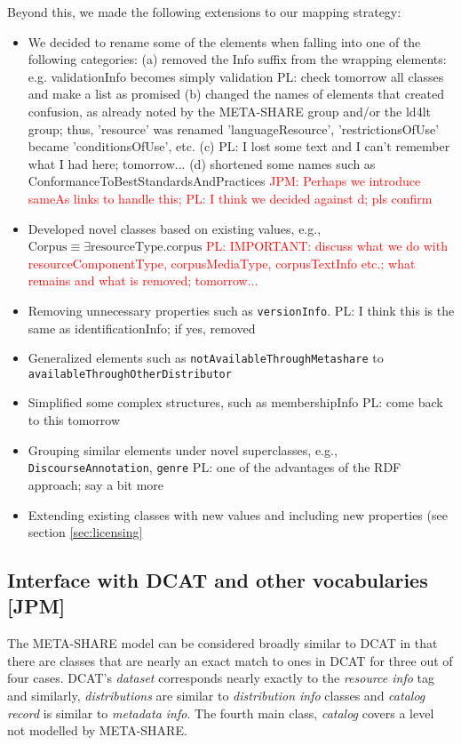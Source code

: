 \documentclass{llncs}
\begin{document}
{Beyond this, we made the following extensions to our mapping strategy:
\begin{itemize}
\item We decided to rename some of the elements when falling into one of the following categories:
(a) removed the Info suffix from the wrapping elements: e.g. validationInfo becomes simply validation {PL: check tomorrow all classes and make a list as promised}
(b) changed the names of elements that created confusion, as already noted by the META-SHARE group and/or the ld4lt group; thus, 'resource' was renamed 'languageResource', 'restrictionsOfUse' became 'conditionsOfUse', etc.
(c) {PL: I lost some text and I can't remember what I had here; tomorrow...}
(d) shortened some names such as ConformanceToBestStandardsAndPractices
\textcolor{red}{JPM: Perhaps we introduce sameAs links to handle this; PL: I think we decided against d; pls confirm}
\item Developed novel classes based on existing values, e.g.,
$\mathrm{Corpus} \equiv \exists \mathrm{resourceType}.\mathrm{corpus}$
\textcolor{red} {PL: IMPORTANT: discuss what we do with resourceComponentType, corpusMediaType, corpusTextInfo etc.; what remains and what is removed; tomorrow...}
\item Removing unnecessary properties such as {\tt versionInfo}.
{PL: I think this is the same as identificationInfo; if yes, removed}
\item Generalized elements such as {\tt notAvailableThroughMetashare} to {\tt availableThroughOtherDistributor}
\item Simplified some complex structures, such as membershipInfo  
{PL: come back to this tomorrow}
\item Grouping similar elements under novel superclasses, e.g., {\tt DiscourseAnnotation}, {\tt genre}
{PL: one of the advantages of the RDF approach; say a bit more}
\item Extending existing classes with new values and including new properties (see section \ref{sec:licensing}
\end{itemize}

\subsection{Interface with DCAT and other vocabularies [JPM]}
\label{sec:dcat}
The META-SHARE model can be considered broadly similar to DCAT in that there are
classes that are nearly an exact match to ones in DCAT for three out of four
cases. DCAT's \emph{dataset} corresponds nearly exactly to the \emph{resource
info} tag and similarly, \emph{distributions} are similar to \emph{distribution
info} classes and \emph{catalog record} is similar to \emph{metadata info}. The
fourth main class, \emph{catalog} covers a level not modelled by META-SHARE.

}
\end{document}
